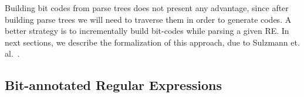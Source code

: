 \documentclass[sigconf]{acmart}
\theoremstyle{definition}
\newtheorem{Example}{Example}
\begin{document}

Building bit codes from parse trees does not present any advantage, since after building parse trees
we will need to traverse them in order to generate codes. A better strategy is to incrementally build
bit-codes while parsing a given RE. In next sections, we describe the formalization of this approach, due to 
Sulzmann et. al.~\cite{SulzmannL14}.

\subsection{Bit-annotated Regular Expressions}
\end{document}
